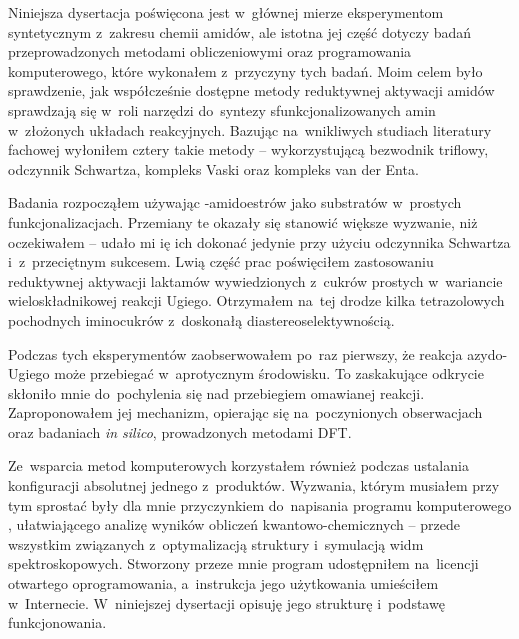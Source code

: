 Niniejsza dysertacja poświęcona jest w~głównej mierze eksperymentom syntetycznym z~zakresu
  chemii amidów, ale istotna jej część dotyczy badań przeprowadzonych metodami obliczeniowymi
  oraz programowania komputerowego, które wykonałem z~przyczyny tych badań.
Moim celem było sprawdzenie, jak współcześnie dostępne metody reduktywnej aktywacji
  amidów sprawdzają się w~roli narzędzi do~syntezy sfunkcjonalizowanych amin w~złożonych
  układach reakcyjnych.
Bazując na~wnikliwych studiach literatury fachowej wyłoniłem cztery takie metody \---
  wykorzystującą bezwodnik triflowy, odczynnik Schwartza, kompleks Vaski oraz kompleks van der Enta.

Badania rozpocząłem używając \textbeta{}-amidoestrów jako substratów w~prostych funkcjonalizacjach.
Przemiany te okazały się stanowić większe wyzwanie, niż oczekiwałem \--- udało mi ię ich dokonać
  jedynie przy użyciu odczynnika Schwartza i~z~przeciętnym sukcesem.
Lwią część prac poświęciłem zastosowaniu reduktywnej aktywacji laktamów wywiedzionych z~cukrów
  prostych w~wariancie wieloskładnikowej reakcji Ugiego.
Otrzymałem na~tej drodze kilka tetrazolowych pochodnych iminocukrów z~doskonałą
  diastereoselektywnością.

Podczas tych eksperymentów zaobserwowałem po~raz pierwszy, że reakcja azydo-Ugiego może
  przebiegać w~aprotycznym środowisku.
To zaskakujące odkrycie skłoniło mnie do~pochylenia się nad przebiegiem omawianej reakcji.
Zaproponowałem jej mechanizm, opierając się na~poczynionych obserwacjach oraz badaniach
  \textit{in silico}, prowadzonych metodami DFT.

Ze~wsparcia metod komputerowych korzystałem również podczas ustalania konfiguracji absolutnej
  jednego z~produktów.
Wyzwania, którym musiałem przy tym sprostać były dla mnie przyczynkiem do~napisania programu
  komputerowego \tesliper{}, ułatwiającego analizę wyników obliczeń kwantowo-chemicznych \---
  przede wszystkim związanych z~optymalizacją struktury i~symulacją widm spektroskopowych.
Stworzony przeze mnie program udostępniłem na~licencji otwartego
  oprogramowania, a~instrukcja jego użytkowania umieściłem w~Internecie.
W~niniejszej dysertacji opisuję jego strukturę i~podstawę funkcjonowania.


